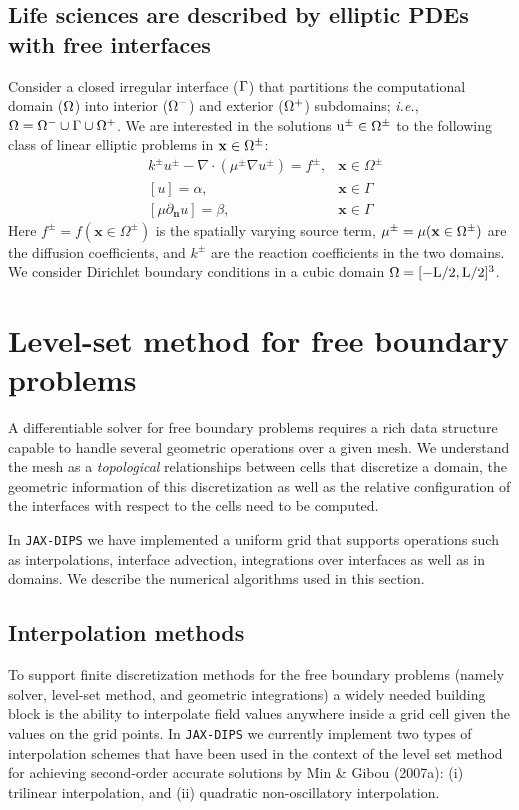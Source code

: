 \documentclass{elsarticle}
\begin{document}
\subsection{Life sciences are described by elliptic PDEs with free interfaces}
Consider a closed irregular interface ($\rm \Gamma$) that partitions the computational domain ($\rm \Omega$) into interior ($\rm \Omega^-$) and exterior ($\rm \Omega^+$) subdomains; \textit{i.e.}, $\rm \Omega=\Omega^- \cup \Gamma \cup \Omega^+$. We are interested in the solutions $\rm u^\pm\in \Omega^\pm$ to the following class of linear elliptic problems in  $\rm \mathbf{x}\in\Omega^\pm$:
\begin{align*}
	 & k^{\pm}u^{\pm} - \nabla \cdot (\mu^{\pm}\nabla u^\pm)=f^{\pm}, & \mathbf{x}\in\Omega^\pm \\
	 & [u]=\alpha,                                                    & \mathbf{x} \in \Gamma   \\
	 & [\mu \partial_{\mathbf{n}}u]=\beta,                            & \mathbf{x} \in \Gamma
\end{align*}
Here $f^\pm=f(\mathbf{x} \in \Omega^\pm)$ is the spatially varying source term, $\rm \mu^\pm=\mu(\mathbf{x} \in \Omega^\pm)$  are the diffusion coefficients, and $k^\pm$ are the reaction coefficients in the two domains. We consider Dirichlet boundary conditions in a cubic domain $\rm \Omega=[-L/2,L/2]^3$.




\section{Level-set method for free boundary problems}
A differentiable solver for free boundary problems requires a rich data structure capable to handle several geometric operations over a given mesh. We understand the mesh as a \textit{topological} relationships between cells that discretize a domain, the geometric information of this discretization as well as the relative configuration of the interfaces with respect to the cells need to be computed. 

In \texttt{JAX-DIPS} we have implemented a uniform grid that supports operations such as interpolations, interface advection, integrations over interfaces as well as in domains. We describe the numerical algorithms used in this section.


\subsection{Interpolation methods}
To support finite discretization methods for the free boundary problems (namely solver, level-set method, and geometric integrations) a widely needed building block is the ability to interpolate field values anywhere inside a grid cell given the values on the grid points. In \texttt{JAX-DIPS} we currently implement two types of interpolation schemes that have been used in the context of the level set method for achieving second-order accurate solutions by Min \& Gibou (2007a)\cite{MIN2007300}: (i) trilinear interpolation, and (ii) quadratic non-oscillatory interpolation.
\end{document}
